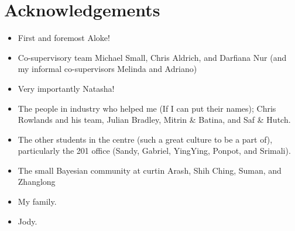 
\chapter*{Acknowledgements} 
\begin{itemize}
  \item First and foremost Aloke!
  \item Co-supervisory team Michael Small, Chris Aldrich, and Darfiana Nur (and my informal co-supervisors Melinda and Adriano)
  \item Very importantly Natasha!
  \item The people in industry who helped me (If I can put their names); Chris Rowlands and his team, Julian Bradley, Mitrin \& Batina, and Saf \& Hutch.
  \item The other students in the centre (such a great culture to be a part of), particularly the 201 office (Sandy, Gabriel, YingYing, Ponpot, and Srimali).
  \item The small Bayesian community at curtin Arash, Shih Ching, Suman, and Zhanglong
  \item My family.
  \item Jody.
\end{itemize}
\vspace*{\fill}